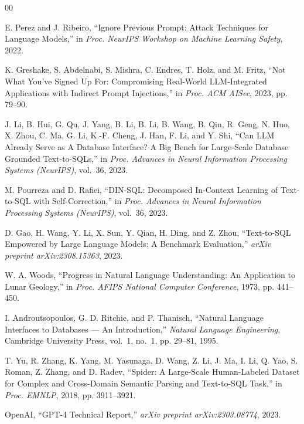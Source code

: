 \documentclass[conference]{IEEEtran}
\begin{document}
\begin{thebibliography}{00}

E. Perez and J. Ribeiro, ``Ignore Previous Prompt: Attack Techniques for
Language Models,'' in \textit{Proc. NeurIPS Workshop on Machine Learning
Safety}, 2022.

K. Greshake, S. Abdelnabi, S. Mishra, C. Endres, T. Holz, and M. Fritz,
``Not What You've Signed Up For: Compromising Real-World LLM-Integrated
Applications with Indirect Prompt Injections,'' in \textit{Proc. ACM
AISec}, 2023, pp. 79--90.

J. Li, B. Hui, G. Qu, J. Yang, B. Li, B. Li, B. Wang, B. Qin, R. Geng,
N. Huo, X. Zhou, C. Ma, G. Li, K.-F. Cheng, J. Han, F. Li, and Y. Shi,
``Can LLM Already Serve as A Database Interface? A Big Bench for Large-Scale
Database Grounded Text-to-SQLs,'' in \textit{Proc. Advances in Neural
Information Processing Systems (NeurIPS)}, vol.~36, 2023.

M. Pourreza and D. Rafiei, ``DIN-SQL: Decomposed In-Context Learning of
Text-to-SQL with Self-Correction,'' in \textit{Proc. Advances in Neural
Information Processing Systems (NeurIPS)}, vol.~36, 2023.

D. Gao, H. Wang, Y. Li, X. Sun, Y. Qian, H. Ding, and Z. Zhou,
``Text-to-SQL Empowered by Large Language Models: A Benchmark Evaluation,''
\textit{arXiv preprint arXiv:2308.15363}, 2023.

W. A. Woods,
``Progress in Natural Language Understanding: An Application to Lunar
Geology,'' in \textit{Proc. AFIPS National Computer Conference}, 1973,
pp. 441--450.

I. Androutsopoulos, G. D. Ritchie, and P. Thanisch,
``Natural Language Interfaces to Databases --- An Introduction,''
\textit{Natural Language Engineering}, Cambridge University Press,
vol.~1, no.~1, pp. 29--81, 1995.

T. Yu, R. Zhang, K. Yang, M. Yasunaga, D. Wang, Z. Li, J. Ma, I. Li,
Q. Yao, S. Roman, Z. Zhang, and D. Radev,
``Spider: A Large-Scale Human-Labeled Dataset for Complex and Cross-Domain
Semantic Parsing and Text-to-SQL Task,''
in \textit{Proc. EMNLP}, 2018, pp. 3911--3921.

OpenAI, ``GPT-4 Technical Report,'' \textit{arXiv preprint arXiv:2303.08774},
2023.


\end{thebibliography}
\end{document}
